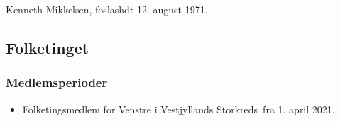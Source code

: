 \documentclass[11pt, a4paper]{awesome-cv}
\begin{document}
\makecvheader[R]
\makelettertitle
\begin{cvletter}
Kenneth Mikkelsen, foslashdt 12. august 1971.

\subsection*{Folketinget}
\subsubsection*{Medlemsperioder}
\begin{itemize}
\item Folketingsmedlem for Venstre i Vestjyllands Storkreds fra 1. april 2021.
\end{itemize}
\end{cvletter}
\end{document}
